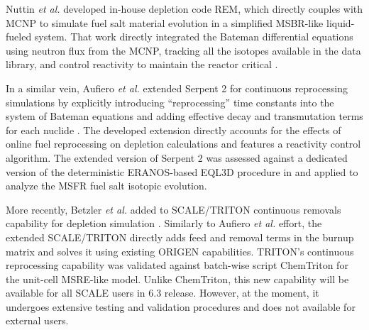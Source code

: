 Nuttin \emph{et al.} developed in-house depletion code REM, which directly 
couples with \gls{MCNP} \cite{werner_mcnp_2017-1} to simulate fuel salt 
material evolution in a simplified \gls{MSBR}-like liquid-fueled system. That 
work directly integrated the Bateman differential equations using neutron flux 
from the \gls{MCNP}, tracking all the isotopes available in the data library, 
and control reactivity to maintain the reactor critical  
\cite{nuttin_potential_2005}.

In a similar vein, Aufiero \emph{et al.} extended Serpent 2 for continuous 
reprocessing simulations by explicitly introducing ``reprocessing'' time 
constants into the system of Bateman equations and adding effective decay and 
transmutation terms for each nuclide \cite{aufiero_extended_2013}. The 
developed extension directly accounts for the effects of online fuel 
reprocessing on depletion calculations and features a reactivity control 
algorithm. The extended version of Serpent 2 was assessed against a dedicated 
version of the deterministic ERANOS-based EQL3D procedure in 
\cite{fiorina_investigation_2013} and applied to analyze the \gls{MSFR} fuel 
salt isotopic evolution.

More recently, Betzler \emph{et al.} added to SCALE/TRITON continuous removals 
capability for depletion simulation \cite{betzler_molten_2019}. Similarly to 
Aufiero \emph{et al.} effort, the extended SCALE/TRITON directly adds feed and 
removal terms in the burnup matrix and solves it using existing ORIGEN 
capabilities. TRITON's continuous reprocessing capability was validated 
against batch-wise script ChemTriton for the unit-cell \gls{MSRE}-like model. 
Unlike ChemTriton, this new capability will be available for all SCALE users 
in 6.3 release. However, at the moment, it undergoes extensive testing and 
validation procedures and does not available for external users.

